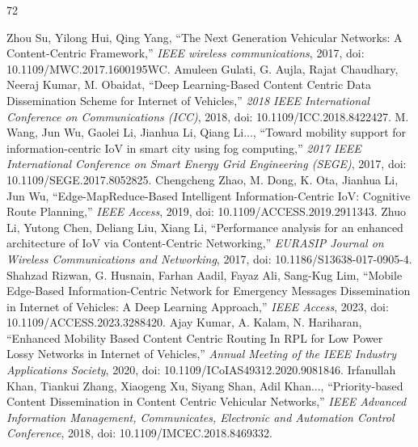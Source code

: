 \documentclass[journal]{IEEEtran}
\begin{document}
\begin{thebibliography}{72}




Zhou Su, Yilong Hui, Qing Yang, ``The Next Generation Vehicular Networks: A Content-Centric Framework,'' \textit{IEEE wireless communications}, 2017, doi: 10.1109/MWC.2017.1600195WC.
Amuleen Gulati, G. Aujla, Rajat Chaudhary, Neeraj Kumar, M. Obaidat, ``Deep Learning-Based Content Centric Data Dissemination Scheme for Internet of Vehicles,'' \textit{2018 IEEE International Conference on Communications (ICC)}, 2018, doi: 10.1109/ICC.2018.8422427.
M. Wang, Jun Wu, Gaolei Li, Jianhua Li, Qiang Li..., ``Toward mobility support for information-centric IoV in smart city using fog computing,'' \textit{2017 IEEE International Conference on Smart Energy Grid Engineering (SEGE)}, 2017, doi: 10.1109/SEGE.2017.8052825.
Chengcheng Zhao, M. Dong, K. Ota, Jianhua Li, Jun Wu, ``Edge-MapReduce-Based Intelligent Information-Centric IoV: Cognitive Route Planning,'' \textit{IEEE Access}, 2019, doi: 10.1109/ACCESS.2019.2911343.
Zhuo Li, Yutong Chen, Deliang Liu, Xiang Li, ``Performance analysis for an enhanced architecture of IoV via Content-Centric Networking,'' \textit{EURASIP Journal on Wireless Communications and Networking}, 2017, doi: 10.1186/S13638-017-0905-4.
Shahzad Rizwan, G. Husnain, Farhan Aadil, Fayaz Ali, Sang-Kug Lim, ``Mobile Edge-Based Information-Centric Network for Emergency Messages Dissemination in Internet of Vehicles: A Deep Learning Approach,'' \textit{IEEE Access}, 2023, doi: 10.1109/ACCESS.2023.3288420.
Ajay Kumar, A. Kalam, N. Hariharan, ``Enhanced Mobility Based Content Centric Routing In RPL for Low Power Lossy Networks in Internet of Vehicles,'' \textit{Annual Meeting of the IEEE Industry Applications Society}, 2020, doi: 10.1109/ICoIAS49312.2020.9081846.
Irfanullah Khan, Tiankui Zhang, Xiaogeng Xu, Siyang Shan, Adil Khan..., ``Priority-based Content Dissemination in Content Centric Vehicular Networks,'' \textit{IEEE Advanced Information Management, Communicates, Electronic and Automation Control Conference}, 2018, doi: 10.1109/IMCEC.2018.8469332.

\end{thebibliography}
\end{document}
